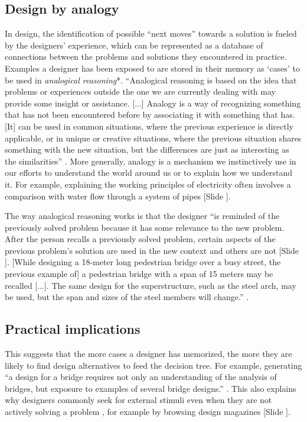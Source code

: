 \documentclass{article}
\newcounter{slide}
\begin{document}
\subsection{Design by analogy}
\label{sec:cbr}
In design, the identification of possible ``next moves'' towards a solution is fueled by the designers' experience, which can be represented as a database of connections between the problems and solutions they encountered in practice. Examples a designer has been exposed to are stored in their memory as `cases' to be used in \emph{analogical reasoning}*. ``Analogical reasoning is based on the idea that problems or experiences outside the one we are currently dealing with may provide some insight or assistance. [...] Analogy is a way of recognizing something that has not been encountered before by associating it with something that has. [It] can be used in common situations, where the previous experience is directly applicable, or in unique or creative situations, where the previous situation shares something with the new situation, but the differences are just as interesting as the similarities'' \cite[p. 1]{maher2014case}. More generally, analogy is a mechanism we instinctively use in our efforts to understand the world around us or to explain how we understand it. For example, explaining the working principles of electricity often involves a comparison with water flow through a system of pipes {\color{blue}[Slide ]}. 

The way analogical reasoning works is that the designer ``is reminded of the previously solved problem because it has some relevance to the new problem. After the person recalls a previously solved problem, certain aspects of the previous problem's solution are used in the new context and others are not {\color{blue}[Slide ]}. [While designing a 18-meter long pedestrian bridge over a busy street, the previous example of] a pedestrian bridge with a span of 15 meters may be recalled [...]. The same design for the superstructure, such as the steel arch, may be used, but the span and sizes of the steel members will change.'' \cite[p. 1-4]{maher2014case}.

\subsection{Practical implications}
\label{sec:Practicalimplicationsone}
This suggests that the more cases a designer has memorized, the more they are likely to find design alternatives to feed the decision tree. For example, generating ``a design for a bridge requires not only an understanding of the analysis of bridges, but exposure to examples of several bridge designs.'' \cite[p. 1]{maher2014case}. This also explains why designers commonly seek for external stimuli even when they are not actively solving a problem \cite{goncalvesInspirationChoicesThat2016}, for example by browsing design magazines {\color{blue}[Slide ]}.
\end{document}
